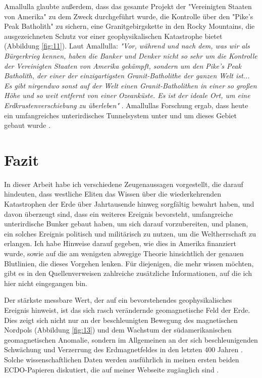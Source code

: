\documentclass[10pt,twocolumn,letterpaper]{article}
\begin{document}
Amallulla glaubte außerdem, dass das gesamte Projekt der "Vereinigten Staaten von Amerika" zu dem Zweck durchgeführt wurde, die Kontrolle über den "Pike’s Peak Batholith" zu sichern, eine Granitgebirgskette in den Rocky Mountains, die ausgezeichneten Schutz vor einer geophysikalischen Katastrophe bietet (Abbildung \ref{fig:11}). Laut Amallulla: \textit{"Vor, während und nach dem, was wir als Bürgerkrieg kennen, haben die Banker und Denker nicht so sehr um die Kontrolle der Vereinigten Staaten von Amerika gekämpft, sondern um den Pike’s Peak Batholith, der einer der einzigartigsten Granit-Batholithe der ganzen Welt ist... Es gibt nirgendwo sonst auf der Welt einen Granit-Batholithen in einer so großen Höhe und so weit entfernt von einer Ozeanküste. Es ist der ideale Ort, um eine Erdkrustenverschiebung zu überleben"} \cite{33,34}. Amallullas Forschung ergab, dass heute ein umfangreiches unterirdisches Tunnelsystem unter und um dieses Gebiet gebaut wurde \cite{36}.

\section{Fazit}

In dieser Arbeit habe ich verschiedene Zeugenaussagen vorgestellt, die darauf hindeuten, dass westliche Eliten das Wissen über die wiederkehrenden Katastrophen der Erde über Jahrtausende hinweg sorgfältig bewahrt haben, und davon überzeugt sind, dass ein weiteres Ereignis bevorsteht, umfangreiche unterirdische Bunker gebaut haben, um sich darauf vorzubereiten, und planen, ein solches Ereignis politisch und militärisch zu nutzen, um die Weltherrschaft zu erlangen. Ich habe Hinweise darauf gegeben, wie dies in Amerika finanziert wurde, sowie auf die am wenigsten abwegige Theorie hinsichtlich der genauen Blutlinien, die dieses Vorgehen lenken. Für diejenigen, die mehr wissen möchten, gibt es in den Quellenverweisen zahlreiche zusätzliche Informationen, auf die ich hier nicht eingegangen bin.

Der stärkste messbare Wert, der auf ein bevorstehendes geophysikalisches Ereignis hinweist, ist das sich rasch verändernde geomagnetische Feld der Erde. Dies zeigt sich nicht nur an der beschleunigten Bewegung des magnetischen Nordpols (Abbildung \ref{fig:13}) und dem Wachstum der südamerikanischen geomagnetischen Anomalie, sondern im Allgemeinen an der sich beschleunigenden Schwächung und Verzerrung des Erdmagnetfeldes in den letzten 400 Jahren \cite{3}. Solche wissenschaftlichen Daten werden ausführlich in meinen ersten beiden ECDO-Papieren diskutiert, die auf meiner Webseite zugänglich sind \cite{3}.
\end{document}
